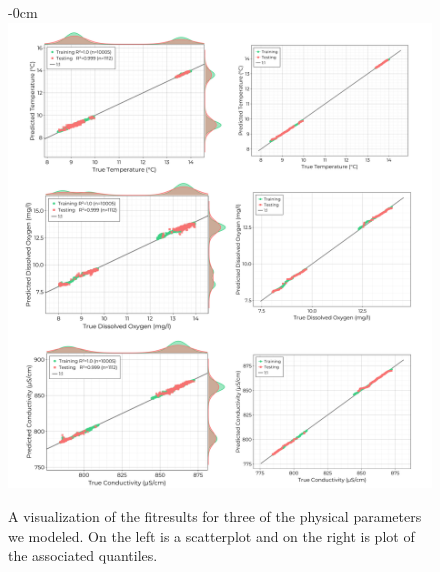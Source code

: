 \documentclass[journal,article,submit,pdftex,moreauthors]{Definitions/mdpi}
\begin{document}
\begin{figure}[H]
\begin{adjustwidth}{-\extralength}{0cm}
\centering
\includegraphics[width=16.0cm]{paper/figures/results/fits/physical-fitres.pdf}
\end{adjustwidth}
\caption{A visualization of the fitresults for three of the physical parameters we modeled. On the left is a scatterplot and on the right is plot of the associated quantiles.\label{fig:physical-fit}}
\end{figure}  
\end{document}
